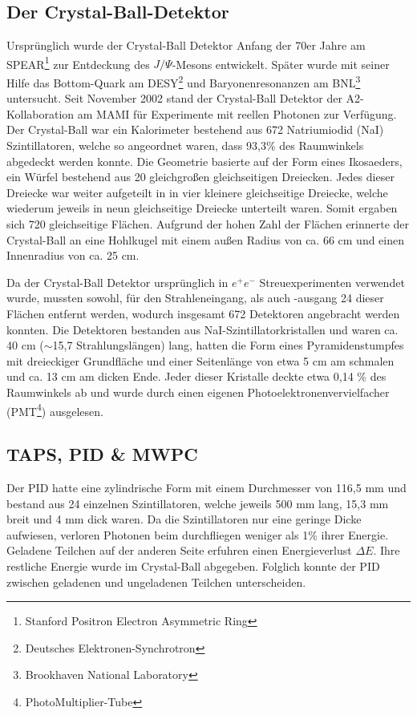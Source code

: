 \documentclass[a4paper,11pt,oneside,final,german,openbib,pdftex]{scrbook}
\begin{document}
{\subsection{Der Crystal-Ball-Detektor}
Ursprünglich wurde der Crystal-Ball Detektor Anfang der 70er Jahre am SPEAR\footnote{Stanford Positron Electron Asymmetric Ring} zur Entdeckung des $J/\Psi$-Mesons entwickelt. Später wurde mit seiner Hilfe das Bottom-Quark am DESY\footnote{Deutsches Elektronen-Synchrotron} und Baryonenresonanzen am BNL\footnote{Brookhaven National Laboratory} untersucht.
Seit November 2002 stand der Crystal-Ball Detektor der A2-Kollaboration am MAMI für Experimente mit reellen Photonen zur Verfügung.
\newline
Der Crystal-Ball war ein Kalorimeter bestehend aus 672 Natriumiodid (NaI) Szintillatoren, welche so angeordnet waren, dass 93,3\% des Raumwinkels abgedeckt werden konnte. 
Die Geometrie basierte auf der Form eines Ikosaeders, ein W\"urfel bestehend aus 20 gleichgro{\ss}en  gleichseitigen Dreiecken. Jedes dieser Dreiecke war weiter aufgeteilt in in vier kleinere gleichseitige Dreiecke, welche wiederum jeweils in neun gleichseitige Dreiecke unterteilt waren. Somit ergaben sich 720 gleichseitige Fl\"achen. Aufgrund der hohen Zahl der Fl\"achen erinnerte der Crystal-Ball an eine Hohlkugel mit einem au{\ss}en Radius von ca. 66 cm und einen Innenradius von ca. 25 cm. 

Da der Crystal-Ball Detektor urspr\"unglich in $e^+e^-$ Streuexperimenten verwendet wurde, mussten sowohl, f\"ur den Strahleneingang, als auch -ausgang 24 dieser Fl\"achen entfernt werden, wodurch insgesamt 672 Detektoren angebracht werden konnten. Die Detektoren bestanden aus NaI-Szintillatorkristallen und waren ca. 40 cm ($\sim$15,7 Strahlungsl\"angen) lang, hatten die Form eines Pyramidenstumpfes mit dreieckiger Grundfl\"ache und einer Seitenl\"ange von etwa 5 cm am schmalen und ca. 13 cm am dicken Ende. Jeder dieser Kristalle deckte etwa 0,14 \% des Raumwinkels ab und wurde durch einen eigenen Photoelektronenvervielfacher (PMT\footnote{PhotoMultiplier-Tube}) ausgelesen. 



\subsection{TAPS, PID \& MWPC}
\label{sec:TAPS-PID-MWPC}
Der PID hatte eine zylindrische Form mit einem Durchmesser von 116,5 mm und bestand aus 24 einzelnen Szintillatoren, welche jeweils 500 mm lang, 15,3 mm breit und 4 mm dick waren. Da die Szintillatoren nur eine geringe Dicke aufwiesen, verloren Photonen beim durchfliegen weniger als 1\% ihrer Energie. Geladene Teilchen auf der anderen Seite erfuhren einen Energieverlust $\Delta E$. Ihre restliche Energie wurde im Crystal-Ball abgegeben. Folglich konnte der PID zwischen geladenen und ungeladenen Teilchen unterscheiden. 

}
\end{document}
